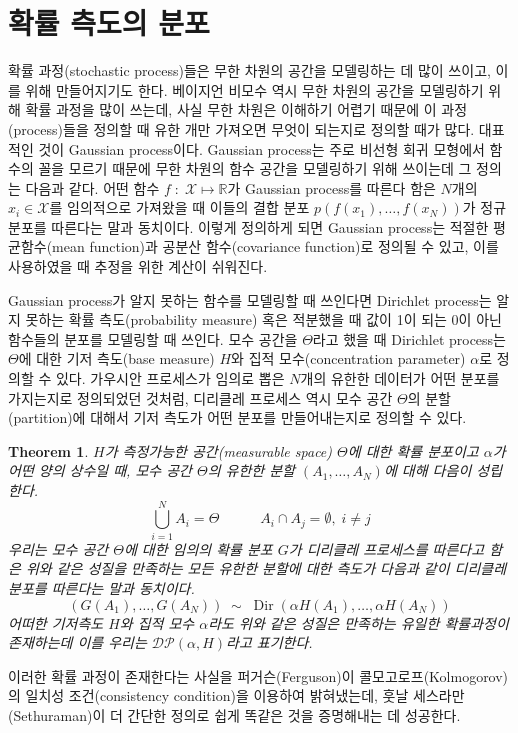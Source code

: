 \documentclass[a4paper, 10pt]{book}
\newtheorem{thm}{Theorem}[section]
\newcommand{\opn}{\operatorname}
\begin{document}
\section{확률 측도의 분포}
  확률 과정(stochastic process)들은 무한 차원의 공간을 모델링하는 데 많이 쓰이고, 이를 위해 만들어지기도 한다. 베이지언 비모수 역시 무한 차원의 공간을 모델링하기 위해 확률 과정을 많이 쓰는데, 사실 무한 차원은 이해하기 어렵기 때문에 이 과정(process)들을 정의할 때 유한 개만 가져오면 무엇이 되는지로 정의할 때가 많다. 대표적인 것이 Gaussian process이다. Gaussian process는 주로 비선형 회귀 모형에서 함수의 꼴을 모르기 때문에 무한 차원의 함수 공간을 모델링하기 위해 쓰이는데 그 정의는 다음과 같다. 어떤 함수 $f\; : \; \mathcal{X}\mapsto \mathbb{R}$가 Gaussian process를 따른다 함은 $N$개의 $x_{i}\in \mathcal{X}$를 임의적으로 가져왔을 때 이들의 결합 분포 $p\left(f\left(x_{1}\right),\ldots ,f\left(x_{N}\right)\right)$가 정규분포를 따른다는 말과 동치이다. 이렇게 정의하게 되면 Gaussian process는 적절한 평균함수(mean function)과 공분산 함수(covariance function)로 정의될 수 있고, 이를 사용하였을 때 추정을 위한 계산이 쉬워진다. \par
  Gaussian process가 알지 못하는 함수를 모델링할 때 쓰인다면 Dirichlet process는 알지 못하는 확률 측도(probability measure) 혹은 적분했을 때 값이 1이 되는 0이 아닌 함수들의 분포를 모델링할 때 쓰인다. 모수 공간을 $\Theta$라고 했을 때 Dirichlet process는 $\Theta$에 대한 기저 측도(base measure) $H$와 집적 모수(concentration parameter) $\alpha$로 정의할 수 있다. 가우시안 프로세스가 임의로 뽑은 $N$개의 유한한 데이터가 어떤 분포를 가지는지로 정의되었던 것처럼, 디리클레 프로세스 역시 모수 공간 $\Theta$의 분할(partition)에 대해서 기저 측도가 어떤 분포를 만들어내는지로 정의할 수 있다.
  \begin{thm}
    $H$가 측정가능한 공간(measurable space) $\Theta$에 대한 확률 분포이고 $\alpha$가 어떤 양의 상수일 때, 모수 공간 $\Theta$의 유한한 분할 $\left(A_{1},\ldots , A_{N}\right)$에 대해 다음이 성립한다.
    $$
      \bigcup_{i=1}^{N}A_{i} = \Theta \hspace{35pt} A_{i}\cap A_{j} = \emptyset,\; i \neq j
    $$
    우리는 모수 공간 $\Theta$에 대한 임의의 확률 분포 $G$가 디리클레 프로세스를 따른다고 함은 위와 같은 성질을 만족하는 모든 유한한 분할에 대한 측도가 다음과 같이 디리클레 분포를 따른다는 말과 동치이다.
    $$
      \left(G\left(A_{1}\right),\ldots ,G\left(A_{N}\right)\right) \;\sim\; \opn{Dir}\left(\alpha H\left(A_{1}\right),\ldots , \alpha H\left(A_{N}\right)\right)
    $$
    어떠한 기저측도 $H$와 집적 모수 $\alpha$라도 위와 같은 성질은 만족하는 유일한 확률과정이 존재하는데 이를 우리는 $\mathcal{DP}\left(\alpha, H\right)$라고 표기한다.
  \end{thm}
  이러한 확률 과정이 존재한다는 사실을 퍼거슨(Ferguson)이 콜모고로프(Kolmogorov)의 일치성 조건(consistency condition)을 이용하여 밝혀냈는데, 훗날 세스라만(Sethuraman)이 더 간단한 정의로 쉽게 똑같은 것을 증명해내는 데 성공한다.
\end{document}

